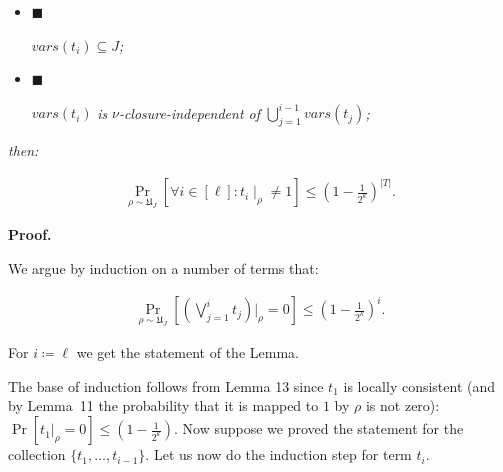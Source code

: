 \documentclass[10pt,a4paper]{article}
\begin{document}
\begin{itemize}


\item[] 
$\blacksquare$ 


$\textit{vars}(t_{i})\subseteq J$\emph{;}\par





\item[] 
$\blacksquare$ 


$\textit{vars}(t_{i})$\emph{ is }$\nu$\emph{-closure-independent of }$\bigcup\limits_{j=1}^{i-1}\textit{vars}(t_{j})$\emph{;}\par





\end{itemize}


\emph{then:}\par


\[\begin{gathered}
\Pr\limits_{\rho\sim\mathfrak{U}_{J}}[\forall i\in[\ell]\colon t_{i}\mid_{\rho%
}\neq 1]\leq\left(1-\frac{1}{2^{k}}\right)^{|T|}.
\end{gathered}\]






\par\medskip\noindent\textbf{Proof.}\par




We argue by induction on a number of terms that:\par


\[\begin{gathered}
\Pr\limits_{\rho\sim\mathfrak{U}_{J}}\left[\left(\bigvee\limits_{j=1}^{i}t_{j}%
\right)|_{\rho}=0\right]\leq\left(1-\frac{1}{2^{k}}\right)^{i}.
\end{gathered}\]


For $i\coloneqq\ell$ we get the statement of the Lemma.\par




The base of induction follows from Lemma 13 since $t_{1}$ is locally
consistent (and by Lemma 11 the probability that it is mapped to $1$ by $\rho$
is not zero): $\Pr[t_{1}|_{\rho}=0]\leq\left(1-\frac{1}{2^{k}}\right)$. Now suppose we proved the
statement for the collection $\{t_{1},\ldots,t_{i-1}\}$. Let us now do the induction step for term $t_{i}$.\par
\end{document}

